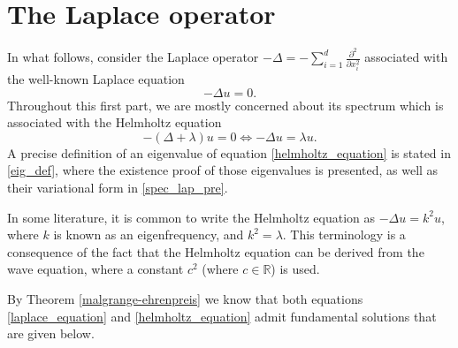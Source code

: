 \section{The Laplace operator}
\label{section:laplace_op}

In what follows, consider the Laplace operator \(-\Delta = -\sum_{i=1}^{d} \frac{\partial^2}{\partial x_i^2}\) associated with the well-known Laplace equation
\begin{equation} \label{laplace_equation}
    -\Delta u = 0.
\end{equation}
Throughout this first part, we are mostly concerned about its spectrum which is associated with the Helmholtz equation
\begin{equation} \label{helmholtz_equation}
    -(\Delta+\lambda) u = 0 \iff -\Delta u = \lambda u.
\end{equation}
A precise definition of an eigenvalue of equation \eqref{helmholtz_equation} is stated in \ref{eig_def}, where the existence proof of those eigenvalues is presented, as well as their variational form in \ref{spec_lap_pre}.
\begin{remark}
    In some literature, it is common to write the Helmholtz equation as \(-\Delta u = k^2 u\), where \(k\) is known as an eigenfrequency, and \(k^2 = \lambda\). This terminology is a consequence of the fact that the Helmholtz equation can be derived from the wave equation, where a constant \(c^2\) (where \(c \in \mathbb{R}\)) is used.
\end{remark}

By Theorem \ref{malgrange-ehrenpreis} we know that both equations \eqref{laplace_equation} and \eqref{helmholtz_equation} admit fundamental solutions that are given below.


